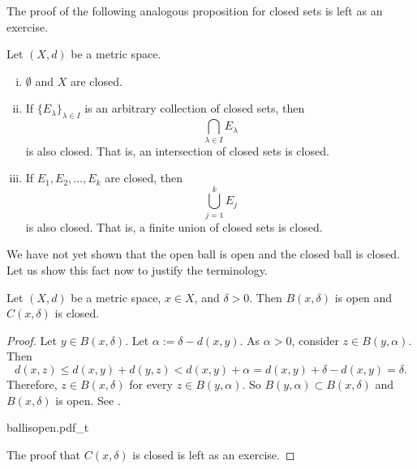 The proof of the following analogous proposition for closed sets
is left as an exercise.

\begin{prop} \label{prop:topology:closed}
\pagebreak[2]
Let $(X,d)$ be a metric space.
\begin{enumerate}[(i)]
\item \label{topology:closedi} $\emptyset$ and $X$ are closed.
\item \label{topology:closedii} If $\{ E_\lambda \}_{\lambda \in I}$ is
an arbitrary collection of closed sets, then
\begin{equation*}
\bigcap_{\lambda \in I} E_\lambda
\end{equation*}
is also closed.  That is, an intersection of closed sets is closed.
\item \label{topology:closediii} If $E_1, E_2, \ldots, E_k$ are closed, then
\begin{equation*}
\bigcup_{j=1}^k E_j
\end{equation*}
is also closed.  That is, a finite union of closed sets is closed.
\end{enumerate}
\end{prop}

We have not yet shown that the open ball is open and the closed ball is
closed.  Let us show this fact now to justify the terminology.

\begin{prop} \label{prop:topology:ballsopenclosed}
Let $(X,d)$ be a metric space, $x \in X$, and $\delta > 0$.  Then
$B(x,\delta)$ is open and 
$C(x,\delta)$ is closed.
\end{prop}

\begin{proof}
Let $y \in B(x,\delta)$.  Let $\alpha := \delta-d(x,y)$.  As $\alpha
> 0$, consider $z \in B(y,\alpha)$.  Then
\begin{equation*}
d(x,z) \leq d(x,y) + d(y,z) < d(x,y) + \alpha = d(x,y) + \delta-d(x,y) =
\delta .
\end{equation*}
Therefore, $z \in B(x,\delta)$ for every $z \in B(y,\alpha)$.  So $B(y,\alpha) \subset B(x,\delta)$ and
$B(x,\delta)$ is open.  See .

\begin{myfigureht}
{ballisopen.pdf_t}
\caption{Proof that $B(x,\delta)$ is open: $B(y,\alpha) \subset
B(x,\delta)$ with the triangle inequality illustrated.\label{fig:ballisopen}}
\end{myfigureht}

The proof that $C(x,\delta)$ is closed is left as an exercise.
\end{proof}

